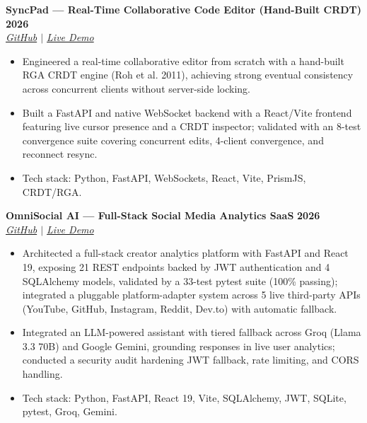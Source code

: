 \documentclass[10pt,letterpaper]{article}
\newcommand{\entry}[4]{%
    \textbf{#1} \hfill \textbf{#3}\\
    \textit{#2} \hfill \textit{#4}\\[0pt]
}
\begin{document}
\entry{SyncPad --- Real-Time Collaborative Code Editor (Hand-Built CRDT)}{\href{https://github.com/i-abhishek-04/SyncPad}{GitHub} $\vert$ \href{https://sync-pad-rho.vercel.app}{Live Demo}}{2026}{}
\vspace{-4pt}
\begin{itemize}
    \item Engineered a real-time collaborative editor from scratch with a hand-built RGA CRDT engine (Roh et al. 2011), achieving strong eventual consistency across concurrent clients without server-side locking.
    \item Built a FastAPI and native WebSocket backend with a React/Vite frontend featuring live cursor presence and a CRDT inspector; validated with an 8-test convergence suite covering concurrent edits, 4-client convergence, and reconnect resync.
    \item Tech stack: Python, FastAPI, WebSockets, React, Vite, PrismJS, CRDT/RGA.
\end{itemize}

\entry{OmniSocial AI --- Full-Stack Social Media Analytics SaaS}{\href{https://github.com/i-abhishek-04/OmniSocial-AI.git}{GitHub} $\vert$ \href{https://omnisocial-ai.vercel.app/}{Live Demo}}{2026}{}
\vspace{-4pt}
\begin{itemize}
    \item Architected a full-stack creator analytics platform with FastAPI and React 19, exposing 21 REST endpoints backed by JWT authentication and 4 SQLAlchemy models, validated by a 33-test pytest suite (100\% passing); integrated a pluggable platform-adapter system across 5 live third-party APIs (YouTube, GitHub, Instagram, Reddit, Dev.to) with automatic fallback.
    \item Integrated an LLM-powered assistant with tiered fallback across Groq (Llama 3.3 70B) and Google Gemini, grounding responses in live user analytics; conducted a security audit hardening JWT fallback, rate limiting, and CORS handling.
    \item Tech stack: Python, FastAPI, React 19, Vite, SQLAlchemy, JWT, SQLite, pytest, Groq, Gemini.
\end{itemize}
\end{document}
